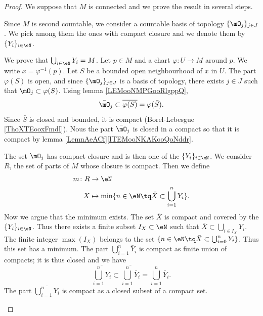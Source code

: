 \begin{proof}
	We suppose that \( M\) is connected and we prove the result in several steps.
	\begin{subproof}
		Since \( M\) is second countable, we consider a countable basis of topology \( \{ \mO_j \}_{j\in J}\). We pick among them the ones with compact closure and we denote them by \( \{ Y_i \}_{i\in \eN}\).

		\spitem[\( Y_i\) covers \( M\)]
		We prove that \( \bigcup_{i\in \eN}Y_i=M\). Let \( p\in M\) and a chart \(\varphi \colon U\to M  \) around \( p\). We write \( x=\varphi^{-1}(p)\). Let \( S\) be a bounded open neighbourhood of \( x\) in \( U\). The part \( \varphi(S)\) is open, and since \( \{ \mO_j \}_{j\in J}\) is a basis of topology, there exists \( j\in J\) such that \( \mO_j\subset\varphi(S)\). Using lemma \ref{LEMooNMPGooRlgppQ},
		\begin{equation}
			\bar\mO_j\subset\overline{\varphi(S)}=\varphi(\bar S).
		\end{equation}
		Since \( \bar S\) is closed and bounded, it is compact (Borel-Lebesgue \ref{ThoXTEooxFmdI}). Nous the part \( \bar\mO_j\) is closed in a compact so that it is compact by lemma \ref{LemnAeACf}\ref{ITEMooNKAKooQoNddr}.

		The set \( \mO_j\) has compact closure and is then one of the \( \{ Y_i \}_{i\in \eN}\).
		We consider \( R\), the set of parts of \( M\) whose closure is compact. Then we define
		\begin{equation}
			\begin{aligned}
				m\colon R & \to \eN                                                         \\
				X         & \mapsto \min\{ n\in \eN\tq \bar X\subset \bigcup_{i=1}^nY_i \}.
			\end{aligned}
		\end{equation}
		Now we argue that the minimum exists. The set \( \bar X\) is compact and covered by the \( \{ Y_i \}_{i\in \eN}\). Thus there exists a finite subset \( I_X\subset \eN\) such that \( \bar X\subset\bigcup_{i\in I_X}Y_i\). The finite integer \( \max(I_X)\) belongs to the set \( \{ n\in \eN\tq \bar X\subset\bigcup_{i=0}^nY_i \}\). Thus this set has a minimum.
				\label{SPITEMooJGIXooJPVzjP}
		The part \( \bigcup_{i=1}^n\bar Y_i\) is compact as finite union of compacts; it is thus closed and we have
		\begin{equation}
			\overline{\bigcup_{i=1}^nY_i}\subset\overline{  \bigcup_{i=1}^n\bar Y_i  }=\bigcup_{i=1}^n\bar Y_i.
		\end{equation}
		The part \( \overline{    \bigcup_{i=1}^nY_i   }\) is compact as a closed subset of a compact set.


\end{subproof}
\end{proof}
